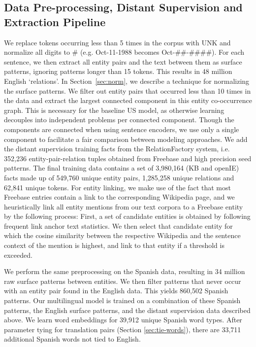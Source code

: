 \subsection{Data Pre-processing, Distant Supervision and Extraction Pipeline \label{sec:ds-el}}

We replace tokens occurring less than 5 times in the corpus with UNK and normalize all digits to \# (e.g. Oct-11-1988 becomes Oct-\#\#-\#\#\#\#). 
For each sentence, we then extract all entity pairs and the text between them as surface patterns, ignoring patterns longer than 15 tokens. 
This results in 48 million English `relations'. In Section~\ref{sec:norm}, we describe a technique for normalizing the surface patterns. 
We filter out entity pairs that occurred less than 10 times in the data and extract the largest connected component in this entity co-occurrence graph. 
This is necessary for the baseline US model, as otherwise learning decouples into independent problems per connected component. 
Though the components are connected when using sentence encoders, we use only a single component to facilitate a fair comparison between modeling approaches. 
We add the distant supervision training facts from the RelationFactory system, i.e. 352,236 entity-pair-relation tuples obtained from Freebase and high precision seed patterns.
The final training data contains a set of 3,980,164 (KB and openIE) facts made up of 549,760 unique entity pairs, 1,285,258 unique relations and 62,841 unique tokens.
For entity linking, we make use of the fact that most Freebase entries contain a link to the corresponding Wikipedia page, and we heuristically link all entity mentions from our text corpora to a Freebase entity by the following process: 
First, a set of candidate entities is obtained by following frequent link anchor text statistics. 
We then select that candidate entity for which the cosine similarity between the respective Wikipedia and the sentence context of the mention is highest, and link to that entity if a threshold is exceeded.

We perform the same preprocessing on the Spanish data, resulting in 34 million raw surface patterns between entities. 
We then filter patterns that never occur with an entity pair found in the English data.  This yields 860,502 Spanish patterns. 
Our multilingual model is trained on a combination of these Spanish patterns, the English surface patterns, and the distant supervision data described above. 
We learn word embeddings for 39,912 unique Spanish word types. 
After parameter tying for translation pairs (Section \ref{sec:tie-words}),  there are 33,711 additional Spanish words not tied to English.

